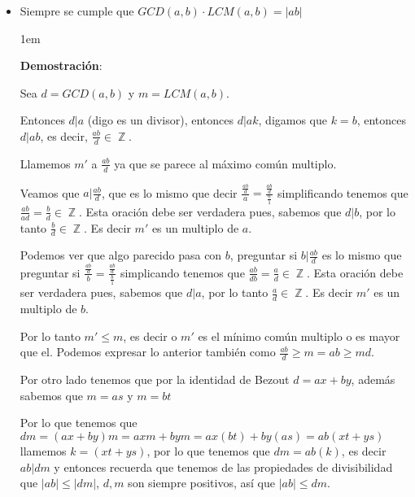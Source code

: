\documentclass[12pt, fleqn]{report}                             %
\newenvironment{SmallIndentation}[1][0.75em]                    %
    {\begin{adjustwidth}{#1}{}\begin{footnotesize}}                 %
    {\end{footnotesize}\end{adjustwidth}}                           %
\DeclareMathOperator \Integers  {\mathbb{Z}}                     %
\begin{document}
            \begin{itemize}

                \item Siempre se cumple que $GCD(a,b) \cdot LCM(a,b) = |ab|$

                    \begin{SmallIndentation}[1em]
                        \textbf{Demostración}:

                        Sea $d = GCD(a,b)$ y $m = LCM(a,b)$.

                        Entonces $d|a$ (digo es un divisor), entonces $d|ak$, digamos que
                        $k=b$, entonces $d|ab$, es decir, $\frac{ab}{d} \in \Integers$.

                        Llamemos $m'$ a $\frac{ab}{d}$ ya que se parece al máximo común multiplo.

                        Veamos que $a|\frac{ab}{d}$, que es lo mismo que decir
                        $\frac{\frac{ab}{d}}{a} = \frac{\frac{ab}{d}}{\frac{a}{1}}$
                        simplificando tenemos que $\frac{ab}{ad} = \frac{b}{d} \in \Integers$.
                        Esta oración debe ser verdadera pues, sabemos que $d|b$,
                        por lo tanto $\frac{b}{d} \in \Integers$. Es decir $m'$ es un multiplo
                        de $a$.

                        Podemos ver que algo parecido pasa con $b$, preguntar si $b|\frac{ab}{d}$
                        es lo mismo que preguntar si  $\frac{\frac{ab}{d}}{b} = \frac{\frac{ab}{d}}{\frac{b}{1}}$
                        simplicando tenemos que  $\frac{ab}{db} = \frac{a}{d} \in \Integers$.
                        Esta oración debe ser verdadera pues, sabemos que $d|a$,
                        por lo tanto $\frac{a}{d} \in \Integers$. Es decir $m'$ es un multiplo
                        de $b$.

                        Por lo tanto $m' \leq m$, es decir o $m'$ es el mínimo común multiplo
                        o es mayor que el. Podemos expresar lo anterior también como 
                        $\frac{ab}{d} \geq m = ab \geq md$.

                        Por otro lado tenemos que por la identidad de Bezout $d=ax+by$,
                        además sabemos que $m=as$ y $m=bt$ 

                        Por lo que tenemos que 
                        $dm = (ax+by)m = axm + bym = ax(bt) + by(as) = ab(xt+ys)$ llamemos
                        $k=(xt+ys)$, por lo que tenemos que $dm = ab(k)$, es decir $ab|dm$
                        y entonces recuerda que tenemos de las propiedades de divisibilidad
                        que $|ab| \leq |dm|$, $d,m$ son siempre positivos, así que 
                        $|ab| \leq dm$.


\end{SmallIndentation}
\end{itemize}
\end{document}
